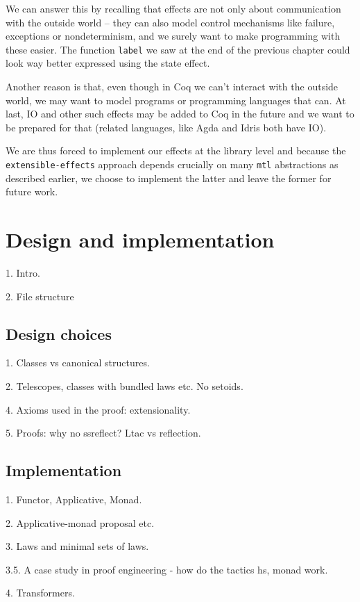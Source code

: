 \documentclass[declaration,inz,english,shortabstract]{iithesis}
\newcommand{\m}[1]{\texttt{#1}}
\begin{document}
We can answer this by recalling that effects are not only about communication with the outside world -- they can also model control mechanisms like failure, exceptions or nondeterminism, and we surely want to make programming with these easier. The function \m{label} we saw at the end of the previous chapter could look way better expressed using the state effect.

Another reason is that, even though in Coq we can't interact with the outside world, we may want to model programs or programming languages that can. At last, IO and other such effects may be added to Coq in the future and we want to be prepared for that (related languages, like Agda \cite{Agda} and Idris \cite{Idris} both have IO).

We are thus forced to implement our effects at the library level and because the \m{extensible-effects} approach depends crucially on many \m{mtl} abstractions as described earlier, we choose to implement the latter and leave the former for future work.

\chapter{Design and implementation}

1. Intro.

2. File structure

\section{Design choices}

1. Classes vs canonical structures.

2. Telescopes, classes with bundled laws etc. No setoids.

4. Axioms used in the proof: extensionality.

5. Proofs: why no ssreflect? Ltac vs reflection.

\section{Implementation}

1. Functor, Applicative, Monad.

2. Applicative-monad proposal etc.

3. Laws and minimal sets of laws.

3.5. A case study in proof engineering - how do the tactics hs, monad work.

4. Transformers.
\end{document}
